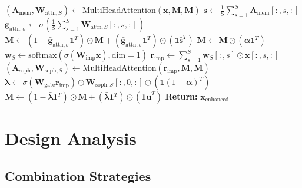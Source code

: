 \documentclass{article}
\begin{document}
\begin{algorithm}
\begin{algorithmic}[1]
        \STATE $(\mathbf{A}_{\text{mem}}, \mathbf{W}_{\text{attn},S}) \leftarrow \text{MultiHeadAttention}(\mathbf{x}, \mathbf{M}, \mathbf{M})$
        \STATE $\mathbf{s} \leftarrow \frac{1}{S}\sum_{s=1}^{S} \mathbf{A}_{\text{mem}}[:, s, :]$ 
        \STATE $\mathbf{g}_{\text{attn},\sigma} \leftarrow \sigma(\frac{1}{S}\sum_{s=1}^{S} \mathbf{W}_{\text{attn},S}[:, s, :])$ 
        \STATE $\mathbf{M} \leftarrow (1 - \bar{\mathbf{g}}_{\text{attn},\sigma} \mathbf{1}^T) \odot \mathbf{M} + (\bar{\mathbf{g}}_{\text{attn},\sigma} \mathbf{1}^T) \odot (\mathbf{1} \bar{\mathbf{s}}^T)$ 
        \STATE $\mathbf{M} \leftarrow \mathbf{M} \odot (\boldsymbol{\alpha} \mathbf{1}^T)$ 
        \STATE $\mathbf{w}_S \leftarrow \text{softmax}(\sigma(\mathbf{W}_{\text{imp}} \mathbf{x}), \text{dim}=1)$ 
        \STATE $\mathbf{r}_{\text{imp}} \leftarrow \sum_{s=1}^{S} \mathbf{w}_S[:, s] \odot \mathbf{x}[:, s, :]$ 
        \STATE $(\mathbf{A}_{\text{soph}}, \mathbf{W}_{\text{soph},S}) \leftarrow \text{MultiHeadAttention}(\mathbf{r}_{\text{imp}}, \mathbf{M}, \mathbf{M})$
        \STATE $\boldsymbol{\lambda} \leftarrow \sigma(\mathbf{W}_{\text{gate}} \mathbf{r}_{\text{imp}}) \odot \mathbf{W}_{\text{soph},S}[:, 0, :] \odot (\mathbf{1} (1 - \boldsymbol{\alpha})^T)$ 
        \STATE $\mathbf{M} \leftarrow (1 - \bar{\boldsymbol{\lambda}} \mathbf{1}^T) \odot \mathbf{M} + (\bar{\boldsymbol{\lambda}} \mathbf{1}^T) \odot (\mathbf{1} \bar{\mathbf{u}}^T)$ 
    \ENDIF
\ENDIF
\STATE \textbf{Return:} $\mathbf{x}_{\text{enhanced}}$
\end{algorithmic}
\end{algorithm}

\section{Design Analysis}

\subsection{Combination Strategies}
\end{document}
